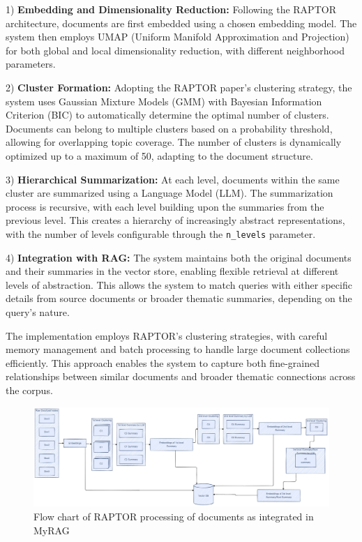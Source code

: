 \documentclass{scrartcl}
\begin{document}
1) \textbf{Embedding and Dimensionality Reduction:} Following the RAPTOR architecture, documents are first embedded using a chosen embedding model. The system then employs UMAP (Uniform Manifold Approximation and Projection) for both global and local dimensionality reduction, with different neighborhood parameters.

2) \textbf{Cluster Formation:} Adopting the RAPTOR paper's clustering strategy, the system uses Gaussian Mixture Models (GMM) with Bayesian Information Criterion (BIC) to automatically determine the optimal number of clusters. Documents can belong to multiple clusters based on a probability threshold, allowing for overlapping topic coverage. The number of clusters is dynamically optimized up to a maximum of 50, adapting to the document structure.

3) \textbf{Hierarchical Summarization:} At each level, documents within the same cluster are summarized using a Language Model (LLM). The summarization process is recursive, with each level building upon the summaries from the previous level. This creates a hierarchy of increasingly abstract representations, with the number of levels configurable through the \texttt{n\_levels} parameter.

4) \textbf{Integration with RAG:} The system maintains both the original documents and their summaries in the vector store, enabling flexible retrieval at different levels of abstraction. This allows the system to match queries with either specific details from source documents or broader thematic summaries, depending on the query's nature.

The implementation employs RAPTOR's clustering strategies, with careful memory management and batch processing to handle large document collections efficiently. This approach enables the system to capture both fine-grained relationships between similar documents and broader thematic connections across the corpus.

\begin{figure}[H]
	\centering
	\includegraphics[width=\linewidth]{Raptor.pdf}
	\caption{Flow chart of RAPTOR processing of documents as integrated in MyRAG}
	\label{fig:raptor}
\end{figure}
\end{document}
